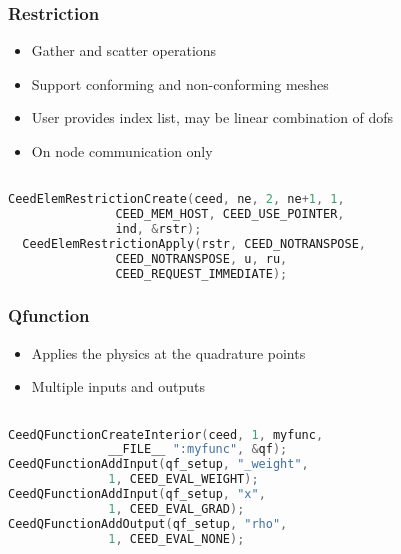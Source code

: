 \documentclass{beamer}
\begin{document}
\begin{frame}[fragile]
\begin{center}
\frametitle{Restriction}

\begin{itemize}

\item Gather and scatter operations\\

\item Support conforming and non-conforming meshes\\

\item User provides index list, may be linear combination of dofs\\

\item On node communication only\\

\end{itemize}

{\small
\begin{lstlisting}[language=C]

CeedElemRestrictionCreate(ceed, ne, 2, ne+1, 1,
               CEED_MEM_HOST, CEED_USE_POINTER,
               ind, &rstr);
  CeedElemRestrictionApply(rstr, CEED_NOTRANSPOSE,
               CEED_NOTRANSPOSE, u, ru,
               CEED_REQUEST_IMMEDIATE);

\end{lstlisting}
}

\end{center}
\end{frame}


\begin{frame}[fragile]
\begin{center}
\frametitle{Qfunction}

\begin{itemize}

\item Applies the physics at the quadrature points\\

\item Multiple inputs and outputs\\

\end{itemize}

{\small
\begin{lstlisting}[language=C]

CeedQFunctionCreateInterior(ceed, 1, myfunc,
              __FILE__ ":myfunc", &qf);
CeedQFunctionAddInput(qf_setup, "_weight", 
              1, CEED_EVAL_WEIGHT);
CeedQFunctionAddInput(qf_setup, "x",
              1, CEED_EVAL_GRAD);
CeedQFunctionAddOutput(qf_setup, "rho",
              1, CEED_EVAL_NONE);

\end{lstlisting}
}

\end{center}
\end{frame}
\end{document}

